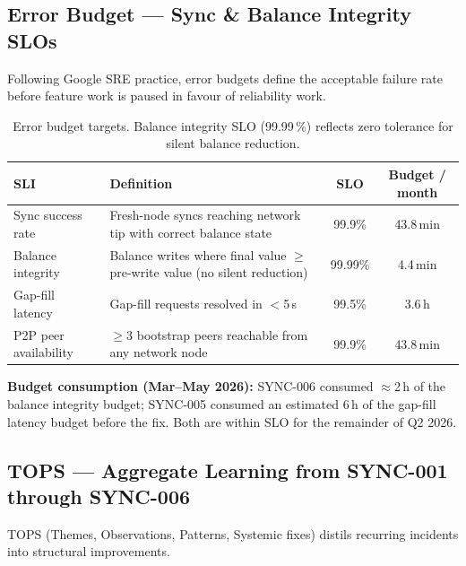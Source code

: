 \documentclass[12pt,a4paper]{article}
\begin{document}
\subsection{Error Budget --- Sync \& Balance Integrity SLOs}

Following Google SRE practice, error budgets define the acceptable failure rate
before feature work is paused in favour of reliability work.

\begin{table}[H]
\centering
\small
\begin{tabularx}{\linewidth}{lXcc}
\toprule
\textbf{SLI} & \textbf{Definition} & \textbf{SLO} & \textbf{Budget / month} \\
\midrule
Sync success rate &
  Fresh-node syncs reaching network tip with correct balance state &
  99.9\% & 43.8\,min \\
\rowcolor{rowgray}
Balance integrity &
  Balance writes where final value $\geq$ pre-write value (no silent reduction) &
  99.99\% & 4.4\,min \\
Gap-fill latency &
  Gap-fill requests resolved in $<$5\,s &
  99.5\% & 3.6\,h \\
\rowcolor{rowgray}
P2P peer availability &
  $\geq$3 bootstrap peers reachable from any network node &
  99.9\% & 43.8\,min \\
\bottomrule
\end{tabularx}
\caption{Error budget targets. Balance integrity SLO (99.99\,\%) reflects zero
  tolerance for silent balance reduction.}
\end{table}

\textbf{Budget consumption (Mar--May 2026):}
SYNC-006 consumed $\approx$2\,h of the balance integrity budget;
SYNC-005 consumed an estimated 6\,h of the gap-fill latency budget before the fix.
Both are within SLO for the remainder of Q2 2026.

\subsection{TOPS --- Aggregate Learning from SYNC-001 through SYNC-006}

TOPS (Themes, Observations, Patterns, Systemic fixes) distils recurring
incidents into structural improvements.
\end{document}
